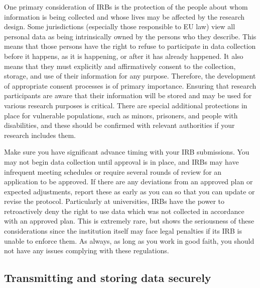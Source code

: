 One primary consideration of IRBs
is the protection of the people about whom information is being collected
and whose lives may be affected by the research design.
Some jurisdictions (especially those responsible to EU law) view all personal data
as being intrinsically owned by the persons who they describe.
This means that those persons have the right to refuse to participate in data collection
before it happens, as it is happening, or after it has already happened.
It also means that they must explicitly and affirmatively consent
to the collection, storage, and use of their information for any purpose.
Therefore, the development of appropriate consent processes is of primary importance.
Ensuring that research participants are aware that their information
will be stored and may be used for various research purposes is critical.
There are special additional protections in place for vulnerable populations,
such as minors, prisoners, and people with disabilities,
and these should be confirmed with relevant authorities if your research includes them.

Make sure you have significant advance timing with your IRB submissions.
You may not begin data collection until approval is in place,
and IRBs may have infrequent meeting schedules
or require several rounds of review for an application to be approved.
If there are any deviations from an approved plan or expected adjustments,
report these as early as you can so that you can update or revise the protocol.
Particularly at universities, IRBs have the power to retroactively deny
the right to use data which was not collected in accordance with an approved plan.
This is extremely rare, but shows the seriousness of these considerations
since the institution itself may face legal penalties if its IRB
is unable to enforce them. As always, as long as you work in good faith,
you should not have any issues complying with these regulations.

\subsection{Transmitting and storing data securely}

